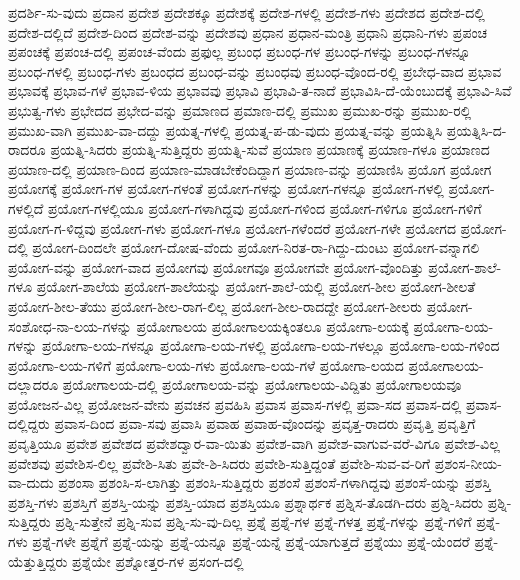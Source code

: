 {ಪ್ರದರ್ಶಿ-ಸು-ವುದು
ಪ್ರದಾನ
ಪ್ರದೇಶ
ಪ್ರದೇಶಕ್ಕೂ
ಪ್ರದೇಶಕ್ಕೆ
ಪ್ರದೇಶ-ಗಳಲ್ಲಿ
ಪ್ರದೇಶ-ಗಳು
ಪ್ರದೇಶದ
ಪ್ರದೇಶ-ದಲ್ಲಿ
ಪ್ರದೇಶ-ದಲ್ಲಿದೆ
ಪ್ರದೇಶ-ದಿಂದ
ಪ್ರದೇಶ-ವನ್ನು
ಪ್ರದೇಶವು
ಪ್ರಧಾನ
ಪ್ರಧಾನ-ಮಂತ್ರಿ
ಪ್ರಧಾನಿ
ಪ್ರಧಾನಿ-ಗಳು
ಪ್ರಪಂಚ
ಪ್ರಪಂಚಕ್ಕೆ
ಪ್ರಪಂಚ-ದಲ್ಲಿ
ಪ್ರಪಂಚ-ವೆಂದು
ಪ್ರಫುಲ್ಲ
ಪ್ರಬಂಧ
ಪ್ರಬಂಧ-ಗಳ
ಪ್ರಬಂಧ-ಗಳನ್ನು
ಪ್ರಬಂಧ-ಗಳನ್ನೂ
ಪ್ರಬಂಧ-ಗಳಲ್ಲಿ
ಪ್ರಬಂಧ-ಗಳು
ಪ್ರಬಂಧದ
ಪ್ರಬಂಧ-ವನ್ನು
ಪ್ರಬಂಧವು
ಪ್ರಬಂಧ-ವೊಂದ-ರಲ್ಲಿ
ಪ್ರಬೇಧ-ವಾದ
ಪ್ರಭಾವ
ಪ್ರಭಾವಕ್ಕೆ
ಪ್ರಭಾವ-ಗಳೆ
ಪ್ರಭಾವ-ಳಿಯ
ಪ್ರಭಾವವು
ಪ್ರಭಾವಿ
ಪ್ರಭಾವಿ-ತ-ನಾದೆ
ಪ್ರಭಾವಿಸಿ-ದೆ-ಯೆಂಬುದಕ್ಕೆ
ಪ್ರಭಾವಿ-ಸಿವೆ
ಪ್ರಭುತ್ವ-ಗಳು
ಪ್ರಭೇದದ
ಪ್ರಭೇದ-ವನ್ನು
ಪ್ರಮಾಣದ
ಪ್ರಮಾಣ-ದಲ್ಲಿ
ಪ್ರಮುಖ
ಪ್ರಮುಖ-ರನ್ನು
ಪ್ರಮುಖ-ರಲ್ಲಿ
ಪ್ರಮುಖ-ವಾಗಿ
ಪ್ರಮುಖ-ವಾ-ದದ್ದು
ಪ್ರಯತ್ನ-ಗಳಲ್ಲಿ
ಪ್ರಯತ್ನ-ಪ-ಡು-ವುದು
ಪ್ರಯತ್ನ-ವನ್ನು
ಪ್ರಯತ್ನಿಸಿ
ಪ್ರಯತ್ನಿಸಿ-ದ-ರಾದರೂ
ಪ್ರಯತ್ನಿ-ಸಿದರು
ಪ್ರಯತ್ನಿ-ಸುತ್ತಿದ್ದರು
ಪ್ರಯತ್ನಿ-ಸುವೆ
ಪ್ರಯಾಣ
ಪ್ರಯಾಣಕ್ಕೆ
ಪ್ರಯಾಣ-ಗಳೂ
ಪ್ರಯಾಣದ
ಪ್ರಯಾಣ-ದಲ್ಲಿ
ಪ್ರಯಾಣ-ದಿಂದ
ಪ್ರಯಾಣ-ಮಾಡಬೇಕೆಂದಿದ್ದಾಗ
ಪ್ರಯಾಣ-ವನ್ನು
ಪ್ರಯಾಣಿಸಿ
ಪ್ರಯೊಗ
ಪ್ರಯೋಗ
ಪ್ರಯೋಗಕ್ಕೆ
ಪ್ರಯೋಗ-ಗಳ
ಪ್ರಯೋಗ-ಗಳಂತೆ
ಪ್ರಯೋಗ-ಗಳನ್ನು
ಪ್ರಯೋಗ-ಗಳನ್ನೂ
ಪ್ರಯೋಗ-ಗಳಲ್ಲಿ
ಪ್ರಯೋಗ-ಗಳಲ್ಲಿದೆ
ಪ್ರಯೋಗ-ಗಳಲ್ಲಿಯೂ
ಪ್ರಯೋಗ-ಗಳಾಗಿದ್ದವು
ಪ್ರಯೋಗ-ಗಳಿಂದ
ಪ್ರಯೋಗ-ಗಳಿಗೂ
ಪ್ರಯೋಗ-ಗಳಿಗೆ
ಪ್ರಯೋಗ-ಗ-ಳಿದ್ದವು
ಪ್ರಯೋಗ-ಗಳು
ಪ್ರಯೋಗ-ಗಳೂ
ಪ್ರಯೋಗ-ಗಳೆಂದರೆ
ಪ್ರಯೋಗ-ಗಳೇ
ಪ್ರಯೋಗದ
ಪ್ರಯೋಗ-ದಲ್ಲಿ
ಪ್ರಯೋಗ-ದಿಂದಲೇ
ಪ್ರಯೋಗ-ದೋಷ-ವೆಂದು
ಪ್ರಯೋಗ-ನಿರತ-ರಾ-ಗಿದ್ದು-ದುಂಟು
ಪ್ರಯೋಗ-ವನ್ನಾಗಲಿ
ಪ್ರಯೋಗ-ವನ್ನು
ಪ್ರಯೋಗ-ವಾದ
ಪ್ರಯೋಗವು
ಪ್ರಯೋಗವೂ
ಪ್ರಯೋಗವೇ
ಪ್ರಯೋಗ-ವೊಂದಿತ್ತು
ಪ್ರಯೋಗ-ಶಾಲೆ-ಗಳೂ
ಪ್ರಯೋಗ-ಶಾಲೆಯ
ಪ್ರಯೋಗ-ಶಾಲೆಯನ್ನು
ಪ್ರಯೋಗ-ಶಾಲೆ-ಯಲ್ಲಿ
ಪ್ರಯೋಗ-ಶೀಲ
ಪ್ರಯೋಗ-ಶೀಲತೆ
ಪ್ರಯೋಗ-ಶೀಲ-ತೆಯು
ಪ್ರಯೋಗ-ಶೀಲ-ರಾಗ-ಲಿಲ್ಲ
ಪ್ರಯೋಗ-ಶೀಲ-ರಾದದ್ದೇ
ಪ್ರಯೋಗ-ಶೀಲರು
ಪ್ರಯೋಗ-ಸಂಶೋಧ-ನಾ-ಲಯ-ಗಳನ್ನು
ಪ್ರಯೋಗಾಲಯ
ಪ್ರಯೋಗಾಲಯಕ್ಕಿಂತಲೂ
ಪ್ರಯೋಗಾ-ಲಯಕ್ಕೆ
ಪ್ರಯೋಗಾ-ಲಯ-ಗಳನ್ನು
ಪ್ರಯೋಗಾ-ಲಯ-ಗಳನ್ನೂ
ಪ್ರಯೋಗಾ-ಲಯ-ಗಳಲ್ಲಿ
ಪ್ರಯೋಗಾ-ಲಯ-ಗಳಲ್ಲೂ
ಪ್ರಯೋಗಾ-ಲಯ-ಗಳಿಂದ
ಪ್ರಯೋಗಾ-ಲಯ-ಗಳಿಗೆ
ಪ್ರಯೋಗಾ-ಲಯ-ಗಳು
ಪ್ರಯೋಗಾ-ಲಯ-ಗಳೆ
ಪ್ರಯೋಗಾ-ಲಯದ
ಪ್ರಯೋಗಾಲಯ-ದಲ್ಲಾದರೂ
ಪ್ರಯೋಗಾಲಯ-ದಲ್ಲಿ
ಪ್ರಯೋಗಾಲಯ-ವನ್ನು
ಪ್ರಯೋಗಾಲಯ-ವಿದ್ದಿತು
ಪ್ರಯೋಗಾಲಯವೂ
ಪ್ರಯೋಜನ-ವಿಲ್ಲ
ಪ್ರಯೋಜನ-ವೇನು
ಪ್ರವಚನ
ಪ್ರವಹಿಸಿ
ಪ್ರವಾಸ
ಪ್ರವಾಸ-ಗಳಲ್ಲಿ
ಪ್ರವಾ-ಸದ
ಪ್ರವಾಸ-ದಲ್ಲಿ
ಪ್ರವಾಸ-ದಲ್ಲಿದ್ದರು
ಪ್ರವಾಸ-ದಿಂದ
ಪ್ರವಾ-ಸವು
ಪ್ರವಾಸಿ
ಪ್ರವಾಹ
ಪ್ರವಾಹ-ವೊಂದನ್ನು
ಪ್ರವೃತ್ತ-ರಾದರು
ಪ್ರವೃತ್ತಿ
ಪ್ರವೃತ್ತಿಗೆ
ಪ್ರವೃತ್ತಿಯೂ
ಪ್ರವೇಶ
ಪ್ರವೇಶದ
ಪ್ರವೇಶದ್ವಾರ-ವಾ-ಯಿತು
ಪ್ರವೇಶ-ವಾಗಿ
ಪ್ರವೇಶ-ವಾಗುವ-ವರೆ-ವಿಗೂ
ಪ್ರವೇಶ-ವಿಲ್ಲ
ಪ್ರವೇಶವು
ಪ್ರವೇಶಿಸ-ಲಿಲ್ಲ
ಪ್ರವೇಶಿ-ಸಿತು
ಪ್ರವೇ-ಶಿ-ಸಿದರು
ಪ್ರವೇಶಿ-ಸುತ್ತಿದ್ದಂತೆ
ಪ್ರವೇಶಿ-ಸುವ-ವ-ರಿಗೆ
ಪ್ರಶಂಸ-ನೀಯ-ವಾ-ದುದು
ಪ್ರಶಂಸಾ
ಪ್ರಶಂಸಿ-ಸ-ಲಾಗಿತ್ತು
ಪ್ರಶಂಸಿ-ಸುತ್ತಿದ್ದರು
ಪ್ರಶಂಸೆ
ಪ್ರಶಂಸೆ-ಗಳಾಗಿದ್ದವು
ಪ್ರಶಂಸೆ-ಯನ್ನು
ಪ್ರಶಸ್ತಿ
ಪ್ರಶಸ್ತಿ-ಗಳು
ಪ್ರಶಸ್ತಿಗೆ
ಪ್ರಶಸ್ತಿ-ಯನ್ನು
ಪ್ರಶಸ್ತಿ-ಯಾದ
ಪ್ರಶಸ್ತಿಯೂ
ಪ್ರಶ್ನಾರ್ಥಕ
ಪ್ರಶ್ನಿಸ-ತೊಡಗಿ-ದರು
ಪ್ರಶ್ನಿ-ಸಿದರು
ಪ್ರಶ್ನಿ-ಸುತ್ತಿದ್ದರು
ಪ್ರಶ್ನಿ-ಸುತ್ತೇನೆ
ಪ್ರಶ್ನಿ-ಸುವ
ಪ್ರಶ್ನಿ-ಸು-ವು-ದಿಲ್ಲ
ಪ್ರಶ್ನೆ
ಪ್ರಶ್ನೆ-ಗಳ
ಪ್ರಶ್ನೆ-ಗಳತ್ತ
ಪ್ರಶ್ನೆ-ಗಳನ್ನು
ಪ್ರಶ್ನೆ-ಗಳಿಗೆ
ಪ್ರಶ್ನೆ-ಗಳು
ಪ್ರಶ್ನೆ-ಗಳೇ
ಪ್ರಶ್ನೆಗೆ
ಪ್ರಶ್ನೆ-ಯನ್ನು
ಪ್ರಶ್ನೆ-ಯನ್ನೂ
ಪ್ರಶ್ನೆ-ಯನ್ನೆ
ಪ್ರಶ್ನೆ-ಯಾಗುತ್ತದೆ
ಪ್ರಶ್ನೆಯು
ಪ್ರಶ್ನೆ-ಯೆಂದರೆ
ಪ್ರಶ್ನೆ-ಯೆತ್ತುತ್ತಿದ್ದರು
ಪ್ರಶ್ನೆಯೇ
ಪ್ರಶ್ನೋತ್ತರ-ಗಳ
ಪ್ರಸಂಗ-ದಲ್ಲಿ
}
